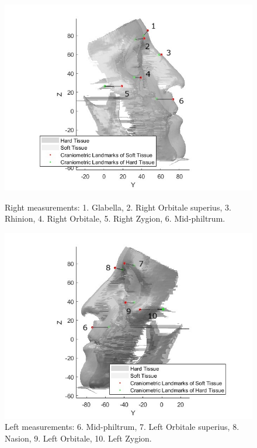\documentclass[journal,article,submit,pdftex,moreauthors]{Definitions/mdpi}
\begin{document}
\begin{figure}[H]
\centering
\vspace{-0.2cm}
\begin{minipage}{0.48\textwidth}
\centering
\includegraphics[width=\linewidth]{Definitions/right_num.jpg}
\caption{Right measurements: 1. Glabella, 2. Right Orbitale superius, 3. Rhinion, 4. Right Orbitale, 5. Right Zygion, 6. Mid-philtrum.}
\label{fig1}
\end{minipage}\hfill
\begin{minipage}{0.48\textwidth}
\centering
\includegraphics[width=\linewidth]{Definitions/left_num.jpg}
\caption{Left measurements: 6. Mid-philtrum, 7. Left Orbitale superius, 8. Nasion, 9. Left Orbitale, 10. Left Zygion.}
\label{fig2}
\end{minipage}
\end{figure}
\end{document}
